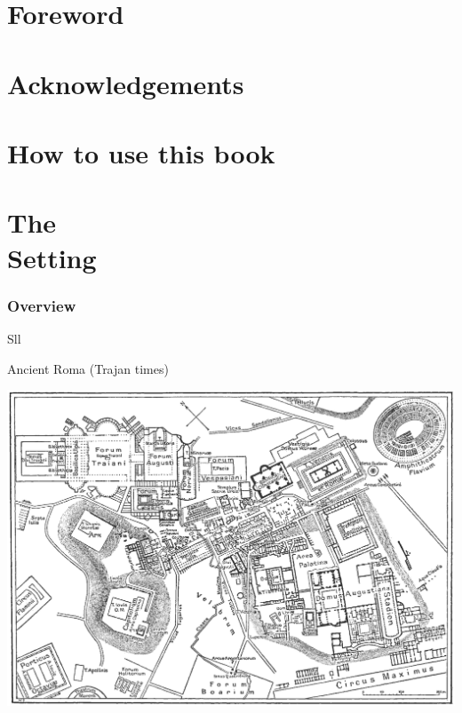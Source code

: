 \documentclass[print,Draft]{faosyb}
\begin{document}
\addtocounter{page}{1}  %

\frontmatter

\tableofcontents
\listofmaps
\listoftables
\listofcharts

\part*{Foreword}
\lipsum

\part*{Acknowledgements}
\lipsum

\part*{How to use this book}
\lipsum


\mainmatter
{}
\part[The Setting]{The\\ Setting}
\lipsum
\EndPartIntro

\section{Overview}
\label{sec:first}

\lipsum[1-4]

\begin{map}{S}{ll}
\caption{Ancient Roma  (Trajan times)}
\label{map:roma}
\includegraphics[width=\chartwidth,height=\chartheight]{Rome}
\end{map}
\end{document}
